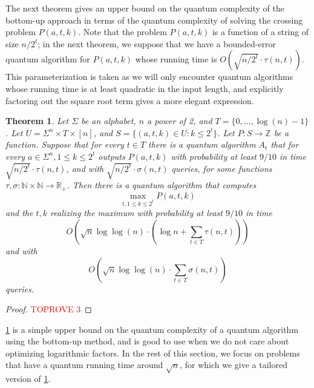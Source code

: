 \documentclass[12pt]{article}
\newcommand{\N}{\mathbb{N}}
\newcommand{\R}{\mathbb{R}}
\newcommand{\Z}{\mathbb{Z}}
\newtheorem{theorem}{Theorem}
\theoremstyle{definition}
\begin{document}
The next theorem gives an upper bound on the quantum complexity of the bottom-up approach in terms of the quantum complexity of solving the crossing problem $P(a, t, k)$. 
Note that the problem $P(a, t, k)$ is a function of a string of size $n/2^t$; in the next theorem, we suppose that we have a bounded-error quantum algorithm for $P(a, t, k)$ whose running time is $O(\sqrt{n/2^t} \cdot \tau(n, t))$.  This parameterization is taken as we will only encounter quantum algorithms whose running time is at least quadratic in the input length, and explicitly factoring out the square root term gives a more elegant expression.
\begin{theorem}
\label{thm:bu_easy}
Let $\Sigma$ be an alphabet, $n$ a power of 2, and $T = \{0, \ldots, \log(n) - 1\}$.
Let $U = \Sigma^n \times T \times [n]$, and $S = \{(a, t, k) \in U : k \le 2^t\}$.
Let $P : S \rightarrow \Z$ be a function. 
Suppose that for every $t \in T$ there is a quantum algorithm $A_t$ that for every $a \in \Sigma^n, 1 \le k \le 2^t$ outputs $P(a, t, k)$ with probability at least $9/10$ in time $\sqrt{n/2^t} \cdot \tau(n, t)$, and with $\sqrt{n/2^t} \cdot \sigma(n, t)$ queries, for some functions 
$\tau, \sigma :\N \times \N \rightarrow \R_+$.
Then there is a quantum algorithm that computes 
\[
\max_{t, 1 \le k \le 2^t} P(a, t, k)
\]
and the $t,k$ realizing the maximum with probability at least $9/10$ in time 
\[
O(\sqrt{n} \log \log(n) \cdot (\log n + \sum_{t \in T} \tau(n, t)))
\]
and with
\[
O(\sqrt{n} \log \log(n) \cdot \sum_{t \in T} \sigma(n, t))
\]
queries.
\end{theorem}

\begin{proof}\textcolor{red}{TOPROVE 3}\end{proof}

\cref{thm:bu_easy} is a simple upper bound on the quantum complexity of a quantum algorithm using the bottom-up method, and is good to use when we do not care about optimizing logarithmic factors. In the rest of this section, we focus on problems that have a quantum running time around $\sqrt{n}$, for which we give a tailored version of \cref{thm:bu_easy}.
\end{document}
